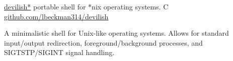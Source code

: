 \showoff
{\href{https://liambeckman.com/projects/devilish}{devilish*}}
{portable shell for *nix operating systems.}
{C}
{\href{https://github.com/lbeckman314/devilish}{github.com/lbeckman314/devilish}}

A minimalistic shell for Unix-like operating systems. Allows for standard input/output redirection, foreground/background processes, and SIGTSTP/SIGINT signal handling.

\myBreak
